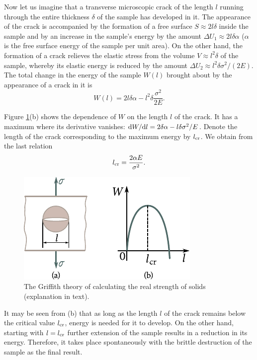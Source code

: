 Now let us imagine that a transverse microscopic crack of the length $l$ running through the entire thickness $\delta$ of the sample has developed in it. The appearance of the crack is accompanied by the formation of a free surface $S\approx 2l\delta$ inside the sample and by an increase in the sample's energy by the amount $\Delta{U}_1\approx 2l\delta\alpha$ ($\alpha$ is the free surface energy of the sample per unit area). On the other hand, the formation of a crack relieves the elastic stress from the volume $V\approx l^2\delta$ of the sample, whereby its elastic energy is reduced by the amount $\Delta{U}_2\approx l^2\delta\sigma^2/(2E)$. The total change in the energy of the sample $W(l)$ brought about by the appearance of a crack in it is
\begin{equation}\label{eq:2_24}
	W(l) = 2 l \delta \alpha - l^2 \delta \frac{\sigma^2}{2E}.
\end{equation}

Figure \ref{fig:2_27}(b) shows the dependence of $W$ on the length $l$ of the crack. It has a maximum where its derivative vanishes: $\mathrm{d} W/\mathrm{d} l=2\delta\alpha-l\delta\sigma^2/E$. Denote the length of the crack corresponding to the maximum energy by $l_{\text{cr}}$. We obtain from the last relation
\begin{equation}\label{eq:2_25}
	l_{\text{cr}} = \frac{2 \alpha E}{\sigma^2}.
\end{equation}

\begin{figure}[t]
	\begin{center}
		\includegraphics[scale=1.0]{figures/ch_02/fig_2_27.pdf}
		\caption[]{The Griffith theory of calculating the real strength of solids (explanation in text).}
		\label{fig:2_27}
	\end{center}
	\vspace{-0.7cm}
\end{figure}

It may be seen from (b) that as long as the length $l$ of the crack remains below the critical value $l_{\text{cr}}$, energy is needed for it to develop. On the other hand, starting with $l=l_{\text{cr}}$ further extension of the sample results in a reduction in its energy. Therefore, it takes place spontaneously with the brittle destruction of the sample as the final result.

